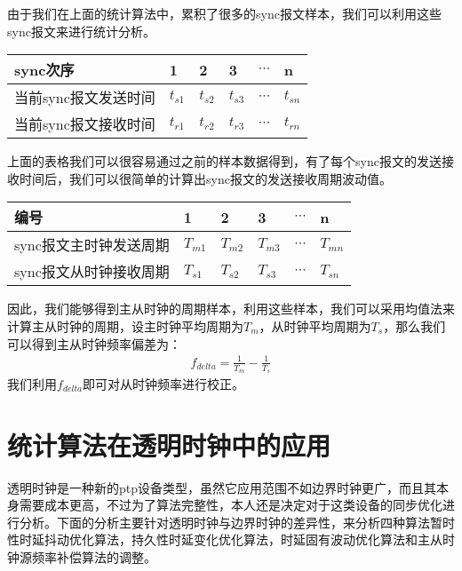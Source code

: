 由于我们在上面的统计算法中，累积了很多的sync报文样本，我们可以利用这些sync报文来进行统计分析。
\begin{table}[!hpb]
  \centering
  \begin{tabular}{llllll} \toprule
    sync次序 & 1 & 2 & 3 & $\cdots$ & n \\ \midrule
    当前sync报文发送时间 & $t_{s1}$ & $t_{s2}$ & $t_{s3}$ & $\cdots$ & $t_{sn}$ \\ \midrule
    当前sync报文接收时间 & $t_{r1}$ & $t_{r2}$ & $t_{r3}$ & $\cdots$ & $t_{rn}$  \\ \bottomrule
  \end{tabular}
\end{table}

上面的表格我们可以很容易通过之前的样本数据得到，有了每个sync报文的发送接收时间后，我们可以很简单的计算出sync报文的发送接收周期波动值。
\begin{table}[!hpb]
  \centering
  \begin{tabular}{llllll} \toprule
    编号 & 1 & 2 & 3 & $\cdots$ & n \\ \midrule
    sync报文主时钟发送周期 & $T_{m1}$ & $T_{m2}$ & $T_{m3}$ & $\cdots$ & $T_{mn}$ \\ \midrule
    sync报文从时钟接收周期 & $T_{s1}$ & $T_{s2}$ & $T_{s3}$ & $\cdots$ & $T_{sn}$  \\ \bottomrule
  \end{tabular}
\end{table}

因此，我们能够得到主从时钟的周期样本，利用这些样本，我们可以采用均值法来计算主从时钟的周期，设主时钟平均周期为$T_{m}$，从时钟平均周期为$T_{s}$，那么我们可以得到主从时钟频率偏差为：
\begin {align}
f_{delta} = \frac{1}{T_{m}} - \frac{1}{T_{s}}
\end{align}
我们利用$f_{delta}$即可对从时钟频率进行校正。

\section{统计算法在透明时钟中的应用}
透明时钟是一种新的ptp设备类型，虽然它应用范围不如边界时钟更广，而且其本身需要成本更高，不过为了算法完整性，本人还是决定对于这类设备的同步优化进行分析。下面的分析主要针对透明时钟与边界时钟的差异性，来分析四种算法暂时性时延抖动优化算法，持久性时延变化优化算法，时延固有波动优化算法和主从时钟源频率补偿算法的调整。

